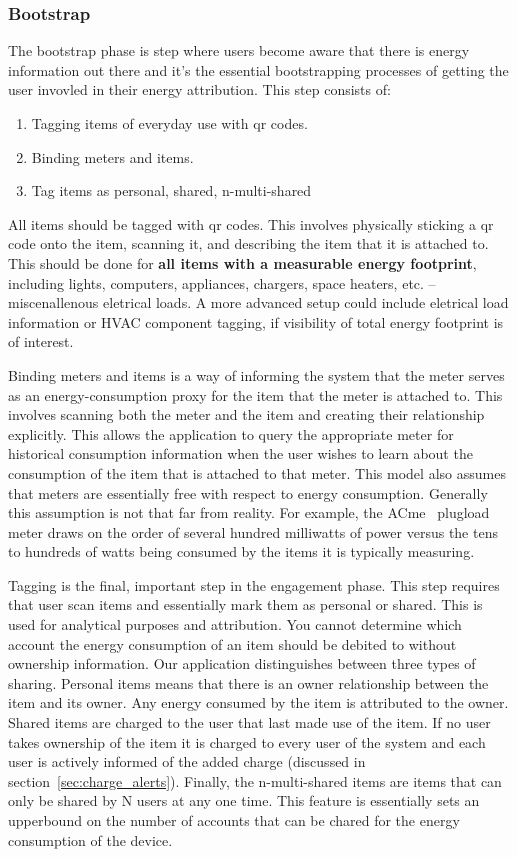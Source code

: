 \subsubsection{Bootstrap}
The bootstrap phase is step where users become aware that there is energy information out there and it's the essential bootstrapping processes
of getting the user invovled in their energy attribution.  This step consists of:

\begin{enumerate}
\item Tagging items of everyday use with qr codes.
\item Binding meters and items.
\item Tag items as personal, shared, n-multi-shared
\end{enumerate}


All items should be tagged with qr codes.  This involves physically sticking a qr code onto the item, scanning it, and describing the item
that it is attached to.  This should be done for {\bf all items with a measurable energy footprint}, including lights, computers, appliances,
chargers, space heaters, etc.  -- miscenallenous eletrical loads.  A more advanced setup could include eletrical load information or HVAC 
component tagging, if visibility of total energy footprint is of interest.

Binding meters and items is a way of informing the system that the meter serves as an energy-consumption proxy for the item that the meter is
attached to.  This involves scanning both the meter and the item and creating their relationship explicitly.  This allows the application to query
the appropriate meter for historical consumption information when the user wishes to learn about the consumption of the item that is attached to that meter.
This model also assumes that meters are essentially free with respect to energy consumption.  Generally this assumption is not that far from reality.
For example, the ACme~\cite{acme} plugload meter draws on the order of several hundred milliwatts of power versus the tens to hundreds of watts being
consumed by the items it is typically measuring.

Tagging is the final, important step in the engagement phase.  This step requires that user scan items and essentially mark them as personal or shared.
This is used for analytical purposes and attribution.  You cannot determine which account the energy consumption of an item should be debited to without
ownership information.  Our application distinguishes between three types of sharing.  Personal items means that there is an owner relationship between
the item and its owner.  Any energy consumed by the item is attributed to the owner.  Shared items are charged to the user that last made use of the item.
If no user takes ownership of the item it is charged to every user of the system and each user is actively informed of the added charge (discussed in
section~\ref{sec:charge_alerts}).  Finally, the n-multi-shared items are items that can only be shared by N users at any one time.  This feature is essentially
sets an upperbound on the number of accounts that can be chared for the energy consumption of the device.

